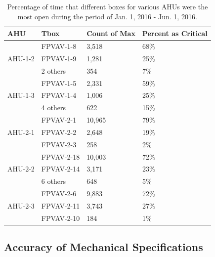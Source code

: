 \begin{table}
\centering
\caption{Percentage of time that different boxes for various AHUs were the most open during the period of Jan. 1, 2016 - Jun. 1, 2016.}
\label{tab:AHU12CriticalZone}
\begin{tabular}{@{}llll@{}}
\toprule
AHU                       &  Tbox       & Count of Max & Percent as Critical \\ \midrule
\multirow{3}{*}{AHU-1-2}  &  FPVAV-1-8  & 3,518        & 68\%                \\
                          &  FPVAV-1-9  & 1,281        & 25\%                \\
                          &  2 others   & 354          & 7\%                 \\ \midrule
\multirow{3}{*}{AHU-1-3} & FPVAV-1-5 & 2,331        & 59\%                \\
                         & FPVAV-1-4 & 1,006        & 25\%                \\
                         & 4 others  & 622          & 15\%                 \\ \midrule
\multirow{3}{*}{AHU-2-1} &  FPVAV-2-1   &   10,965   &    79\%  \\
                         &  FPVAV-2-2   &   2,648   &    19\%  \\
                         &  FPVAV-2-3   &   258   &    2\% \\ \midrule
\multirow{3}{*}{AHU-2-2} &    FPVAV-2-18   &   	10,003	&  72\%  \\
&  FPVAV-2-14   &    	3,171   &  	23\%  \\
&  6 others   &   	648	&  5\%  \\ \midrule
\multirow{3}{*}{AHU-2-3}  & FPVAV-2-6   &   9,883     &   72\%  \\ 
                        & FPVAV-2-11     &   3,743     &   27\%  \\ 
                        & FPVAV-2-10     &   184     &   1\%  \\ \midrule
\end{tabular}
\end{table}


\subsection{Accuracy of Mechanical Specifications}

